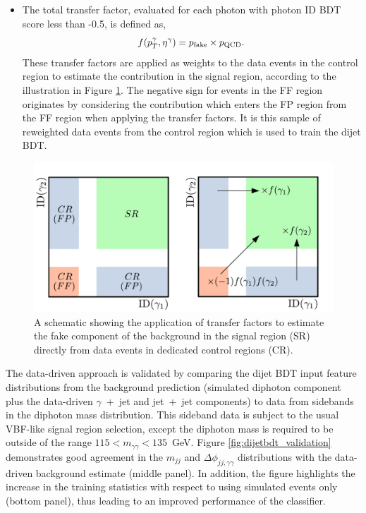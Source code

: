 \begin{itemize}
    \item The total transfer factor, evaluated for each photon with photon ID BDT score less than -0.5, is defined as,
    \begin{equation}
        f(p_T^\gamma,\eta^\gamma) = p_{\rm{fake}} \times p_{\rm{QCD}}.
    \end{equation}
    These transfer factors are applied as weights to the data events in the control region to estimate the contribution in the signal region, according to the illustration in Figure \ref{fig:dijetbdt_transferfunctions}. The negative sign for events in the FF region originates by considering the contribution which enters the FP region from the FF region when applying the transfer factors. It is this sample of reweighted data events from the control region which is used to train the dijet BDT.
\end{itemize}

\begin{figure}[hptb]
  \centering
  \includegraphics[width=.9\textwidth]{Figures/hgg_overview/dijetbdt_illustration.pdf}
  \caption[Illustration of the data-driven background estimate method for the dijet BDT]
  {
    A schematic showing the application of transfer factors to estimate the fake component of the background in the signal region (SR) directly from data events in dedicated control regions (CR).
  }
  \label{fig:dijetbdt_transferfunctions}
\end{figure}

The data-driven approach is validated by comparing the dijet BDT input feature distributions from the background prediction (simulated diphoton component plus the data-driven $\gamma$~+~jet and jet~+~jet components) to data from sidebands in the diphoton mass distribution. This sideband data is subject to the usual VBF-like signal region selection, except the diphoton mass is required to be outside of the range $115<m_{\gamma\gamma}<135$~GeV. Figure \ref{fig:dijetbdt_validation} demonstrates good agreement in the $m_{jj}$ and $\Delta\phi_{jj,\gamma\gamma}$ distributions with the data-driven background estimate (middle panel). In addition, the figure highlights the increase in the training statistics with respect to using simulated events only (bottom panel), thus leading to an improved performance of the classifier. 

